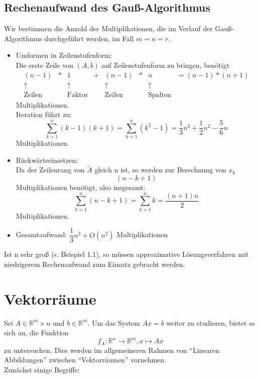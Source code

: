 \documentclass{scrbook}
\begin{document}
\section*{Rechenaufwand des Gauß-Algorithmus}
Wir bestimmen die Anzahl der Multiplikationen, die im Verlauf der Gauß-Algorithmus durchgeführt werden, im Fall \(m=n=r\).
\begin{itemize}
\item Umformen in Zeilenstufenform:\\
Die erste Zeile von \((A,b)\) auf Zeilenstufenform zu bringen, benötigt
\[
\begin{array}{cccccccc}
(n-1) &*&1&+&(n-1)&*&n&=(n-1)*(n+1)\\
\uparrow& &\uparrow& &\uparrow& &\uparrow\\
\text{Zeilen}&&\text{Faktor}&&\text{Zeilen}&&\text{Spalten}
\end{array}
\]
Multiplikationen.\\
Iteration führt zu:
\[
\sum_{k=1}^n (k-1)(k+1) = \sum_{k=1}^n (k^2-1)=\dfrac{1}{3}n^3+\dfrac{1}{2}n^2-\dfrac{5}{6}n
\]
Multiplikationen.
\item Rückwärtseinsetzen:\\
Da der Zeilenrang von \(\tilde{A}\) gleich n ist, so werden zur Berechnung von \(x_k\)\[(n-k+1)\] Multiplikationen benötigt, also insgesamt:
\[
\sum_{k=1}^n (n-k+1)=\sum_{k=1}^n k =\dfrac{(n+1)n}{2}
\]
Multiplikationen.
\item Gesamtaufwand:
\(
\dfrac{1}{3}n^3+O(n^2)\) Multiplikationen
\end{itemize}
Ist n sehr groß (s. Beispiel 1.1), so müssen approximative Lösungsverfahren mit niedrigerem Rechenaufwand zum Einsatz gebracht werden.

\chapter{Vektorräume}
Sei \(A \in \mathbb{R}^m\times n\) und \(b \in \mathbb{R}^m\). Um das System \(Ax=b\) weiter zu studieren, bietet es sich an, die Funktion
\[
f_A:\mathbb{R}^n\rightarrow\mathbb{R}^m,x\mapsto Ax
\]
zu untersuchen. Dies werden im allgemeineren Rahmen von "`Linearen Abbildungen"' zwischen "`Vektorräumen"' vornehmen.\\
Zunächst einige Begriffe:
\end{document}
